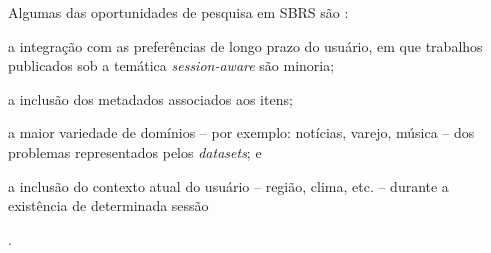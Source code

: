  Algumas das oportunidades de pesquisa em SBRS são \cite{rec_sys_handbook_2022}:
 \begin{inparaenum}[(1)]
     \item a integração com as preferências de longo prazo do usuário, em que
     trabalhos publicados sob a temática \textit{session-aware} são minoria;
     \item a inclusão dos metadados associados aos itens;
     \item a maior variedade de domínios -- por exemplo: notícias, varejo,
     música -- dos problemas representados pelos \textit{datasets}; e
     \item a inclusão do contexto atual do usuário -- região, clima, etc. --
     durante a existência de determinada sessão\end{inparaenum}.

